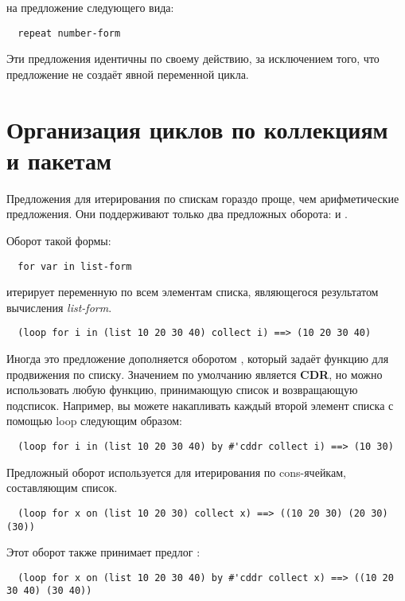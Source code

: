 \noindent{}на предложение  следующего вида:

\begin{lstlisting}
  repeat number-form
\end{lstlisting}

Эти предложения идентичны по своему действию, за исключением того, что предложение
 не создаёт явной переменной цикла.

\section{Организация циклов по коллекциям и пакетам}


Предложения  для итерирования по спискам гораздо проще, чем арифметические
предложения. Они поддерживают только два предложных оборота:  и .

Оборот такой формы:

\begin{lstlisting}
  for var in list-form
\end{lstlisting}

\noindent{}итерирует переменную по всем элементам списка, являющегося результатом вычисления
\textit{list-form}.

\begin{lstlisting}
  (loop for i in (list 10 20 30 40) collect i) ==> (10 20 30 40)
\end{lstlisting}

Иногда это предложение дополняется оборотом , который задаёт функцию для
продвижения по списку. Значением по умолчанию является \textbf{CDR}, но можно использовать
любую функцию, принимающую список и возвращающую подсписок. Например, вы можете
накапливать каждый второй элемент списка с помощью loop следующим образом:

\begin{lstlisting}
  (loop for i in (list 10 20 30 40) by #'cddr collect i) ==> (10 30)
\end{lstlisting}

Предложный оборот  используется для итерирования по cons-ячейкам, сос\-тав\-ляю\-щим
список.

\begin{lstlisting}
  (loop for x on (list 10 20 30) collect x) ==> ((10 20 30) (20 30) (30))
\end{lstlisting}

Этот оборот также принимает предлог :

\begin{lstlisting}
  (loop for x on (list 10 20 30 40) by #'cddr collect x) ==> ((10 20 30 40) (30 40))
\end{lstlisting}

